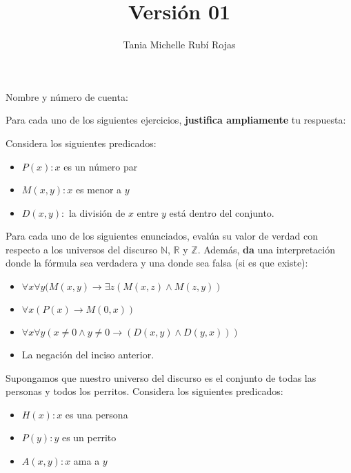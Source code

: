 \documentclass[oneside]{style}
\title{Versión 01}
\author{Tania Michelle Rubí Rojas}
\begin{document}
\maketitle

\vspace{5mm}
\noindent
Nombre y número de cuenta: \hrulefill\

\vspace*{5mm}
Para cada uno de los siguientes ejercicios, \textbf{justifica ampliamente} tu 
respuesta:

\begin{questions}[label=\protect\circled{\bfseries\arabic*}]

    \question
    {
        Considera los siguientes predicados:
        \begin{itemize}
            \item $P(x): x$ es un número par
            \item $M(x,y): x$ es menor a $y$
            \item $D(x,y):$ la división de $x$ entre $y$ está dentro del 
            conjunto. 
        \end{itemize}

        Para cada uno de los siguientes enunciados, evalúa su valor de 
        verdad con respecto a los universos del discurso $\mathbb{N}$, 
        $\mathbb{R}$ y $\mathbb{Z}$. Además, \textbf{da} una interpretación 
        donde la fórmula sea verdadera y una donde sea falsa (si es que 
        existe):

        \begin{itemize}
            \item $\forall x \forall y (M(x,y) \rightarrow \exists z
            (M(x,z) \land M(z,y))$

            \item $\forall x (P(x) \rightarrow M(0,x))$
            
            \item $\forall x \forall y (x \neq 0 \land y \neq 0 
            \rightarrow (D(x,y) \land D(y,x)))$

            \item La negación del inciso anterior. 
        \end{itemize}
    }    
    
    \question
    {
        Supongamos que nuestro universo del discurso es el conjunto de todas 
        las personas y todos los perritos. Considera los siguientes predicados:
        \begin{itemize}
            \item $H(x): x$ es una persona
            \item $P(y): y$ es un perrito 
            \item $A(x,y): x$ ama a $y$
        \end{itemize}
    }


\end{questions}
\end{document}

